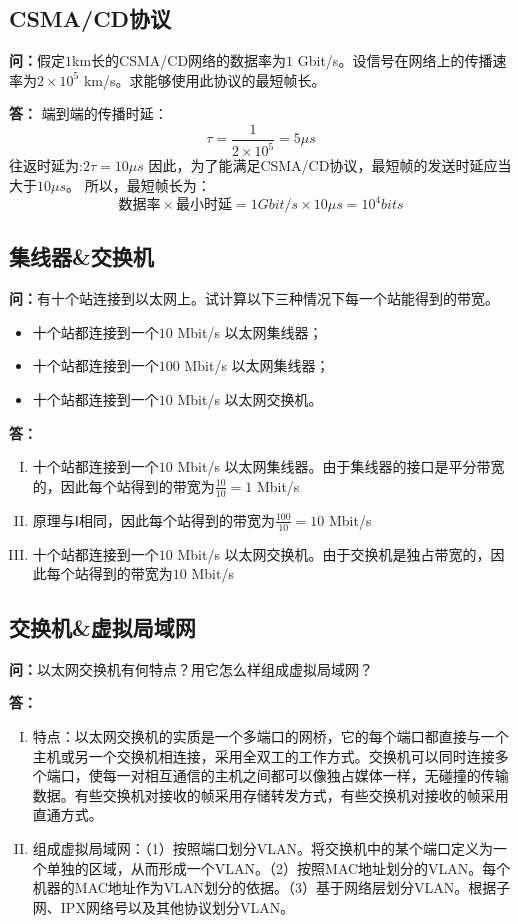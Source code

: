 \documentclass[12pt,hyperref,a4paper,UTF8]{ctexart}
\begin{document}
\subsection{CSMA/CD协议}
\textbf{问：}假定$1$km长的CSMA/CD网络的数据率为$1$ Gbit/s。设信号在网络上的传播速率为$2\times10^5$ km/s。求能够使用此协议的最短帧长。

\textbf{答：}
端到端的传播时延：
\begin{equation}\label{eq:a}
    \tau =\frac{1}{2\times10^5} = 5 \mu s
\end{equation}
往返时延为:$2\tau = 10 \mu s$
因此，为了能满足CSMA/CD协议，最短帧的发送时延应当大于$10 \mu s$。
所以，最短帧长为：
\begin{equation}\label{eq:b}
    \text{数据率} \times \text{最小时延} = 1 Gbit/s \times 10 \mu s = 10^4 bits
\end{equation}

\subsection{集线器\&交换机}
\textbf{问：}有十个站连接到以太网上。试计算以下三种情况下每一个站能得到的带宽。
\begin{itemize}
    \item 十个站都连接到一个$10$ Mbit/s 以太网集线器；
    \item 十个站都连接到一个$100$ Mbit/s 以太网集线器；
    \item 十个站都连接到一个$10$ Mbit/s 以太网交换机。
\end{itemize}

\textbf{答：}
\begin{enumerate}[I.]
    \item 十个站都连接到一个$10$ Mbit/s 以太网集线器。由于集线器的接口是平分带宽的，因此每个站得到的带宽为$\frac{10}{10}=1$ Mbit/s
    \item 原理与Ⅰ相同，因此每个站得到的带宽为$\frac{100}{10}=10$ Mbit/s
    \item 十个站都连接到一个$10$ Mbit/s 以太网交换机。由于交换机是独占带宽的，因此每个站得到的带宽为$10$ Mbit/s
\end{enumerate}

\subsection{交换机\&虚拟局域网}
\textbf{问：}以太网交换机有何特点？用它怎么样组成虚拟局域网？


\textbf{答：}
\begin{enumerate}[I.]
    \item 特点：以太网交换机的实质是一个多端口的网桥，它的每个端口都直接与一个主机或另一个交换机相连接，采用全双工的工作方式。交换机可以同时连接多个端口，使每一对相互通信的主机之间都可以像独占媒体一样，无碰撞的传输数据。有些交换机对接收的帧采用存储转发方式，有些交换机对接收的帧采用直通方式。
    \item 组成虚拟局域网：（1）按照端口划分VLAN。将交换机中的某个端口定义为一个单独的区域，从而形成一个VLAN。（2）按照MAC地址划分的VLAN。每个机器的MAC地址作为VLAN划分的依据。（3）基于网络层划分VLAN。根据子网、IPX网络号以及其他协议划分VLAN。
\end{enumerate}
\end{document}
